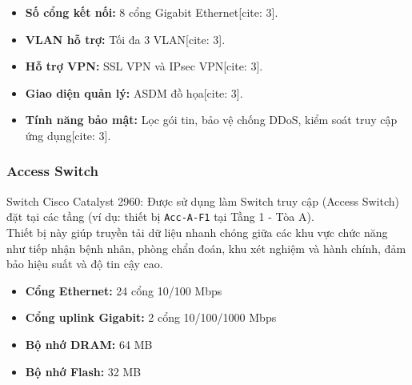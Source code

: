 \begin{tcolorbox}[
        enhanced,
        colback=white,
        colframe=darkgray,
        coltitle=black,
        fonttitle=\large\bfseries,
        title=Thông số kỹ thuật Cisco ASA 5506-X,
        attach boxed title to top left={xshift=5mm, yshift=-3mm},
        boxed title style={colback=white, colframe=darkgray},
        drop fuzzy shadow,
        top=4mm, bottom=2mm, left=2mm, right=2mm
    ]
        \begin{itemize}
            \item \textbf{Số cổng kết nối:} 8 cổng Gigabit Ethernet[cite: 3].
            \item \textbf{VLAN hỗ trợ:} Tối đa 3 VLAN[cite: 3].
            \item \textbf{Hỗ trợ VPN:} SSL VPN và IPsec VPN[cite: 3].
            \item \textbf{Giao diện quản lý:} ASDM đồ họa[cite: 3].
            \item \textbf{Tính năng bảo mật:} Lọc gói tin, bảo vệ chống DDoS, kiểm soát truy cập ứng dụng[cite: 3].
        \end{itemize}
    \end{tcolorbox}

\subsubsection{Access Switch}
Switch Cisco Catalyst 2960: Được sử dụng làm Switch truy cập (Access Switch) đặt tại các tầng (ví dụ: thiết bị \texttt{Acc-A-F1} tại Tầng 1 - Tòa A).\\
\indent Thiết bị này giúp truyền tải dữ liệu nhanh chóng giữa các khu vực chức năng như
tiếp nhận bệnh nhân, phòng chẩn đoán, khu xét nghiệm và hành chính, đảm bảo hiệu
suất và độ tin cậy cao.

\begin{tcolorbox}[
    enhanced,
    colback=white,
    colframe=darkgray,
    coltitle=black,
    fonttitle=\large\bfseries,
    title=Thông số kỹ thuật Cisco WS-C2960-24TT-L,
    attach boxed title to top left={xshift=5mm, yshift=-3mm},
    boxed title style={colback=white, colframe=darkgray},
    drop fuzzy shadow, %
    top=4mm, bottom=2mm, left=2mm, right=2mm
]
    \begin{itemize}
        \item \textbf{Cổng Ethernet:} 24 cổng 10/100 Mbps
        \item \textbf{Cổng uplink Gigabit:} 2 cổng 10/100/1000 Mbps
        \item \textbf{Bộ nhớ DRAM:} 64 MB
        \item \textbf{Bộ nhớ Flash:} 32 MB
    \end{itemize}
\end{tcolorbox}

